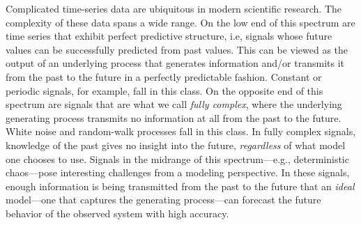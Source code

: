 



%

Complicated time-series data are ubiquitous in modern scientific
research.  The complexity of these data spans a wide range.  On the
low end of this spectrum are time series that exhibit perfect
predictive structure, i.e, signals whose future values can be
successfully predicted from past values.  This can be viewed as the
output of an underlying process that generates information and/or
transmits it from the past to the future in a perfectly predictable
fashion.  Constant or periodic signals, for example, fall in this
class.  On the opposite end of this spectrum are signals that are what
we call \emph{fully complex}, where the underlying generating process
transmits no information at all from the past to the future.  White
noise and random-walk processes fall in this class.  In fully complex
signals, knowledge of the past gives no insight into the future,
\emph{regardless} of what model one chooses to use.  Signals in the
midrange of this spectrum---e.g., deterministic chaos---pose
interesting challenges from a modeling perspective.  In these signals,
enough information is being transmitted from the past to the future
that an \emph{ideal} model---one that captures the generating
process---can forecast the future behavior of the observed system with
high accuracy.

